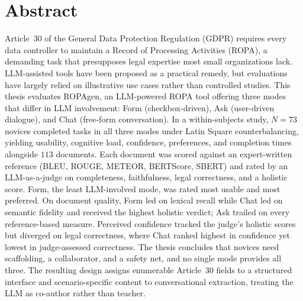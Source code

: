 \chapter*{Abstract}


Article~30 of the General Data Protection Regulation (GDPR) requires every data controller to maintain a Record of Processing Activities (ROPA), a demanding task that presupposes legal expertise most small organizations lack.
LLM-assisted tools have been proposed as a practical remedy, but evaluations have largely relied on illustrative use cases rather than controlled studies.
This thesis evaluates ROPAgen, an LLM-powered ROPA tool offering three modes that differ in LLM involvement: Form (checkbox-driven), Ask (user-driven dialogue), and Chat (free-form conversation).
In a within-subjects study, $N = 73$ novices completed tasks in all three modes under Latin Square counterbalancing, yielding usability, cognitive load, confidence, preferences, and completion times alongside $113$ documents.
Each document was scored against an expert-written reference (BLEU, ROUGE, METEOR, BERTScore, SBERT) and rated by an LLM-as-a-judge on completeness, faithfulness, legal correctness, and a holistic score.
Form, the least LLM-involved mode, was rated most usable and most preferred.
On document quality, Form led on lexical recall while Chat led on semantic fidelity and received the highest holistic verdict; Ask trailed on every reference-based measure.
Perceived confidence tracked the judge's holistic scores but diverged on legal correctness, where Chat ranked highest in confidence yet lowest in judge-assessed correctness.
The thesis concludes that novices need scaffolding, a collaborator, and a safety net, and no single mode provides all three.
The resulting design assigns enumerable Article~30 fields to a structured interface and scenario-specific content to conversational extraction, treating the LLM as co-author rather than teacher.